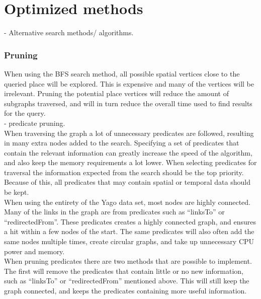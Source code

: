 
\chapter{Optimized methods}

- Alternative search methods/ algorithms.\\

\subsection{Pruning} \label{pruning}
When using the BFS search method, all possible spatial vertices close to the queried place will be explored. This is expensive and many of the vertices will be irrelevant. Pruning the potential place vertices will reduce the amount of subgraphs traversed, and will in turn reduce the overall time used to find results for the query.\\

- predicate pruning. \\
When traversing the graph a lot of unnecessary predicates are followed, resulting in many extra nodes added to the search. Specifying a set of predicates that contain the relevant information can greatly increase the speed of the algorithm, and also keep the memory requirements a lot lower. When selecting predicates for traversal the information expected from the search should be the top priority. Because of this, all predicates that may contain spatial or temporal data should be kept.\\

When using the entirety of the Yago data set, most nodes are highly connected. Many of the links in the graph are from predicates such as ``linksTo'' or ``redirectedFrom''. These predicates creates a highly connected graph, and ensures a hit within a few nodes of the start. The same predicates will also often add the same nodes multiple times, create circular graphs, and take up unnecessary CPU power and memory.\\

When pruning predicates there are two methods that are possible to implement. The first will remove the predicates that contain little or no new information, such as ``linksTo'' or ``redirectedFrom'' mentioned above. This will still keep the graph connected, and keeps the predicates containing more useful information.\\

